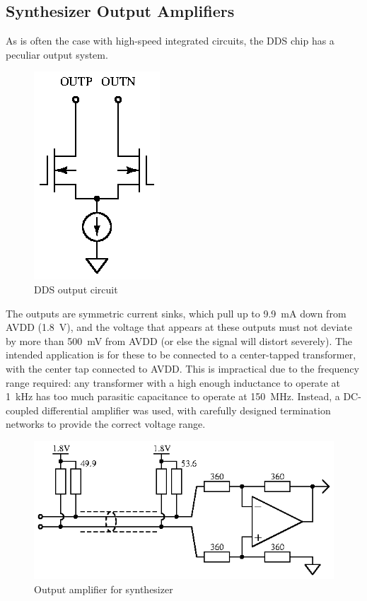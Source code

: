 \subsection{Synthesizer Output Amplifiers}

As is often the case with high-speed integrated circuits, the DDS chip has a
peculiar output system.

\begin{figure}[H]
\centering
\includegraphics{too/dds-output}
\caption{DDS output circuit}
\label{fig:ddsoutput}
\end{figure}

The outputs are symmetric current sinks, which pull up to 9.9~mA
down from AVDD (1.8~V), and the voltage that appears at these
outputs must not deviate by more than 500~mV from AVDD (or else
the signal will distort severely). The intended application is for these
to be connected to a center-tapped transformer, with the center tap connected
to AVDD. This is impractical due to the frequency range required: any
transformer with a high enough inductance to operate at 1~kHz has
too much parasitic capacitance to operate at 150~MHz. Instead,
a DC-coupled differential amplifier was used, with carefully designed
termination networks to provide the correct voltage range.

\begin{figure}[H]
\centering
\includegraphics{too/dds-outamp}
\caption{Output amplifier for synthesizer}
\label{fig:synthoutput}
\end{figure}

